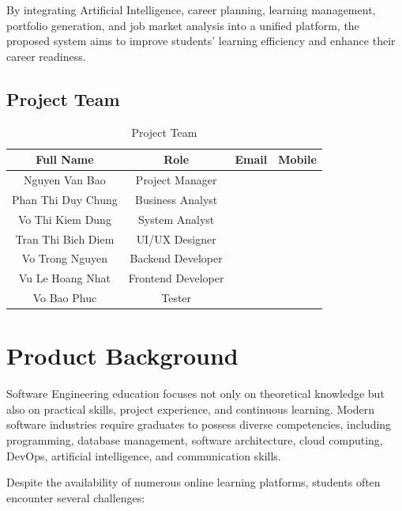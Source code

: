 By integrating Artificial Intelligence, career planning, learning management, portfolio generation, and job market analysis into a unified platform, the proposed system aims to improve students' learning efficiency and enhance their career readiness.


\subsection{Project Team}

\begin{table}[H]
\centering
\caption{Project Team}
\begin{tabular}{|c|c|c|c|}
\hline
\textbf{Full Name} &
\textbf{Role} &
\textbf{Email} &
\textbf{Mobile} \\
\hline

Nguyen Van Bao &
Project Manager &
&
\\
\hline

Phan Thi Duy Chung &
Business Analyst &
&
\\
\hline

Vo Thi Kiem Dung &
System Analyst &
&
\\
\hline

Tran Thi Bich Diem &
UI/UX Designer &
&
\\
\hline

Vo Trong Nguyen &
Backend Developer &
&
\\
\hline

Vu Le Hoang Nhat &
Frontend Developer &
&
\\
\hline

Vo Bao Phuc &
Tester &
&
\\
\hline

\end{tabular}
\end{table}


\section{Product Background}

Software Engineering education focuses not only on theoretical knowledge but also on practical skills, project experience, and continuous learning. Modern software industries require graduates to possess diverse competencies, including programming, database management, software architecture, cloud computing, DevOps, artificial intelligence, and communication skills.

Despite the availability of numerous online learning platforms, students often encounter several challenges:

